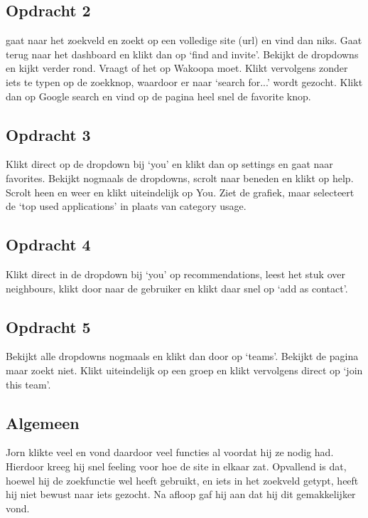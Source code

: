 \subsection{Opdracht 2}
gaat naar het zoekveld en zoekt op een volledige site (url) en vind dan niks. Gaat terug naar het dashboard en klikt dan op `find and invite'. Bekijkt de dropdowns en kijkt verder rond. Vraagt of het op Wakoopa moet. Klikt vervolgens zonder iets te typen op de zoekknop, waardoor er naar `search for...' wordt gezocht. Klikt dan op Google search en vind op de pagina heel snel de favorite knop.

\subsection{Opdracht 3}
Klikt direct op de dropdown bij `you' en klikt dan op settings en gaat naar favorites. Bekijkt nogmaals de dropdowns, scrolt naar beneden en klikt op help. Scrolt heen en weer en klikt uiteindelijk op You. Ziet de grafiek, maar selecteert de `top used applications' in plaats van category usage.

\subsection{Opdracht 4}
Klikt direct in de dropdown bij `you' op recommendations, leest het stuk over neighbours, klikt door naar de gebruiker en klikt daar snel op `add as contact'.

\subsection{Opdracht 5}
Bekijkt alle dropdowns nogmaals en klikt dan door op `teams'. Bekijkt de pagina maar zoekt niet. Klikt uiteindelijk op een groep en klikt vervolgens direct op `join this team'.

\subsection{Algemeen}
Jorn klikte veel en vond daardoor veel functies al voordat hij ze nodig had. Hierdoor kreeg hij snel feeling voor hoe de site in elkaar zat. Opvallend is dat, hoewel hij de zoekfunctie wel heeft gebruikt, en iets in het zoekveld getypt, heeft hij niet bewust naar iets gezocht. Na afloop gaf hij aan dat hij dit gemakkelijker vond.

